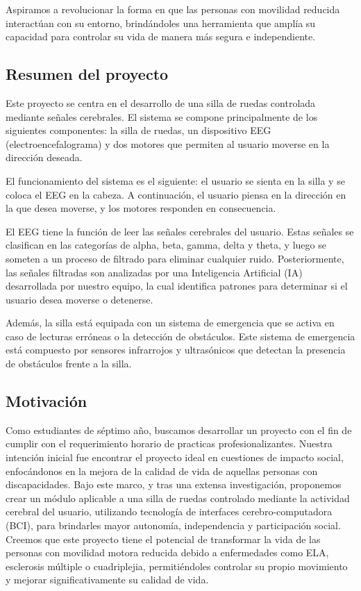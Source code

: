 \documentclass{article}
\begin{document}
Aspiramos a revolucionar la forma en que las personas con movilidad reducida interactúan con su entorno, brindándoles una herramienta que amplía su capacidad para controlar su vida de manera más segura e independiente.

\subsection{Resumen del proyecto}
Este proyecto se centra en el desarrollo de una silla de ruedas controlada mediante señales cerebrales. El sistema se compone principalmente de los siguientes componentes: la silla de ruedas, un dispositivo EEG (electroencefalograma) y dos motores que permiten al usuario moverse en la dirección deseada.

El funcionamiento del sistema es el siguiente: el usuario se sienta en la silla y se coloca el EEG en la cabeza. A continuación, el usuario piensa en la dirección en la que desea moverse, y los motores responden en consecuencia.

El EEG tiene la función de leer las señales cerebrales del usuario. Estas señales se clasifican en las categorías de alpha, beta, gamma, delta y theta, y luego se someten a un proceso de filtrado para eliminar cualquier ruido. Posteriormente, las señales filtradas son analizadas por una Inteligencia Artificial (IA) desarrollada por nuestro equipo, la cual identifica patrones para determinar si el usuario desea moverse o detenerse.

Además, la silla está equipada con un sistema de emergencia que se activa en caso de lecturas erróneas o la detección de obstáculos. Este sistema de emergencia está compuesto por sensores infrarrojos y ultrasónicos que detectan la presencia de obstáculos frente a la silla.

\subsection{Motivación}
Como estudiantes de séptimo año, buscamos desarrollar un proyecto con el fin de cumplir con el requerimiento horario de practicas profesionalizantes. Nuestra intención inicial fue encontrar el proyecto ideal en cuestiones de impacto social, enfocándonos en la mejora de la calidad de vida de aquellas personas con discapacidades. Bajo este marco, y tras una extensa investigación, proponemos crear un módulo aplicable a una silla de ruedas controlado mediante la actividad cerebral del usuario, utilizando tecnología de interfaces cerebro-computadora (BCI), para brindarles mayor autonomía, independencia y participación social.   Creemos que este proyecto tiene el potencial de transformar la vida de las personas con movilidad motora reducida debido a enfermedades como ELA, esclerosis múltiple o cuadriplejia, permitiéndoles controlar su propio movimiento y mejorar significativamente su calidad de vida.
\end{document}
